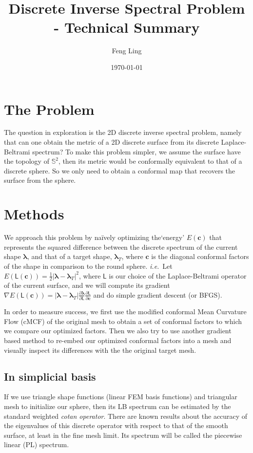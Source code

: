 \documentclass[11pt]{article}
\title{Discrete Inverse Spectral Problem - Technical Summary}
\author{Feng Ling}
\date{\monthyear\today}
\theoremstyle{definition}
\def\pp#1#2{{\frac{\partial #1}{\partial #2}}}
\def\f#1#2{{\frac{#1}{#2}}}
\def\mat#1{\mathsf{#1}}
\def\vect#1{\boldsymbol{\mathbf{#1}}}
\def\grad{\nabla}
\begin{document}
\maketitle
\thispagestyle{empty}

\section{The Problem}
The question in exploration is the 2D discrete inverse spectral problem, namely that can one obtain the metric of a 2D discrete surface from its discrete Laplace-Beltrami spectrum? To make this problem simpler, we assume the surface have the topology of $\mathbb S^2$, then its metric would be conformally equivalent to that of a discrete sphere. So we only need to obtain a conformal map that recovers the surface from the sphere.

\section{Methods}
We approach this problem by na\"ively optimizing the`energy' $E(\vect{c})$ that represents the squared difference between the discrete spectrum of the current shape $\vect{\lambda}$, and that of a target shape, $\vect{\lambda}_{T}$, where $\vect{c}$ is the diagonal conformal factors of the shape in comparison to the round sphere. \textit{i.e.}~Let $E(\mat{L}(\vect{c}))=\f12|\vect{\lambda}-\vect{\lambda}_{T}|^2$, where $\mat L$ is our choice of the Laplace-Beltrami operator of the current surface, and we will compute its gradient $\grad E(\mat{L}(\vect{c})) = |\vect{\lambda}-\vect{\lambda}_{T}|\pp{\vect\lambda}{\mat{L}}\pp{\mat{L}}{\vect{c}}$ and do simple gradient descent (or BFGS).

In order to measure success, we first use the modified conformal Mean Curvature Flow (cMCF) of the original mesh to obtain a set of conformal factors to which we compare our optimized factors. Then we also try to use another gradient based method to re-embed our optimized conformal factors into a mesh and visually inspect its differences with the the original target mesh.

\subsection{In simplicial basis}

If we use triangle shape functions (linear FEM basis functions) and triangular mesh to initialize our sphere, then its LB spectrum can be estimated by the standard weighted \textit{cotan operator}.
There are known results about the accuracy of the eigenvalues of this discrete operator with respect to that of the smooth surface, at least in the fine mesh limit.
Its spectrum will be called the piecewise linear (PL) spectrum.
\end{document}
